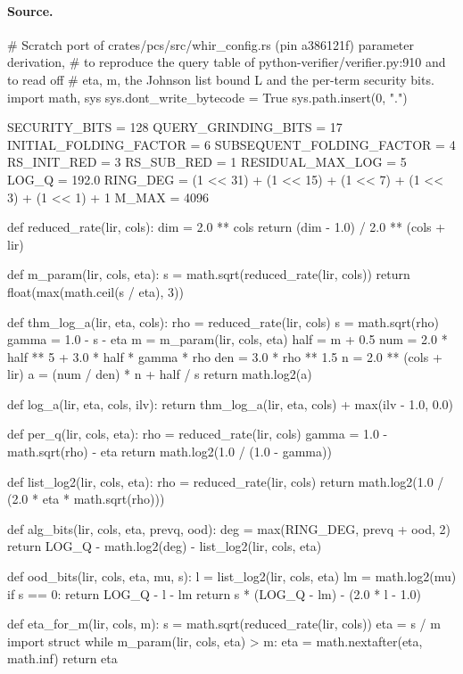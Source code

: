 \paragraph{Source.}
\begin{srccode}
# Scratch port of crates/pcs/src/whir_config.rs (pin a386121f) parameter derivation,
# to reproduce the query table of python-verifier/verifier.py:910 and to read off
# eta, m, the Johnson list bound L and the per-term security bits.
import math, sys
sys.dont_write_bytecode = True
sys.path.insert(0, ".")

SECURITY_BITS = 128
QUERY_GRINDING_BITS = 17
INITIAL_FOLDING_FACTOR = 6
SUBSEQUENT_FOLDING_FACTOR = 4
RS_INIT_RED = 3
RS_SUB_RED = 1
RESIDUAL_MAX_LOG = 5
LOG_Q = 192.0
RING_DEG = (1 << 31) + (1 << 15) + (1 << 7) + (1 << 3) + (1 << 1) + 1
M_MAX = 4096

def reduced_rate(lir, cols):
    dim = 2.0 ** cols
    return (dim - 1.0) / 2.0 ** (cols + lir)

def m_param(lir, cols, eta):
    s = math.sqrt(reduced_rate(lir, cols))
    return float(max(math.ceil(s / eta), 3))

def thm_log_a(lir, eta, cols):
    rho = reduced_rate(lir, cols)
    s = math.sqrt(rho)
    gamma = 1.0 - s - eta
    m = m_param(lir, cols, eta)
    half = m + 0.5
    num = 2.0 * half ** 5 + 3.0 * half * gamma * rho
    den = 3.0 * rho ** 1.5
    n = 2.0 ** (cols + lir)
    a = (num / den) * n + half / s
    return math.log2(a)

def log_a(lir, eta, cols, ilv):
    return thm_log_a(lir, eta, cols) + max(ilv - 1.0, 0.0)

def per_q(lir, cols, eta):
    rho = reduced_rate(lir, cols)
    gamma = 1.0 - math.sqrt(rho) - eta
    return math.log2(1.0 / (1.0 - gamma))

def list_log2(lir, cols, eta):
    rho = reduced_rate(lir, cols)
    return math.log2(1.0 / (2.0 * eta * math.sqrt(rho)))

def alg_bits(lir, cols, eta, prevq, ood):
    deg = max(RING_DEG, prevq + ood, 2)
    return LOG_Q - math.log2(deg) - list_log2(lir, cols, eta)

def ood_bits(lir, cols, eta, mu, s):
    l = list_log2(lir, cols, eta)
    lm = math.log2(mu)
    if s == 0:
        return LOG_Q - l - lm
    return s * (LOG_Q - lm) - (2.0 * l - 1.0)

def eta_for_m(lir, cols, m):
    s = math.sqrt(reduced_rate(lir, cols))
    eta = s / m
    import struct
    while m_param(lir, cols, eta) > m:
        eta = math.nextafter(eta, math.inf)
    return eta


\end{srccode}
